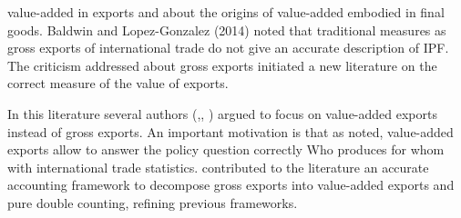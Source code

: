 value-added in exports and about the origins of value-added embodied in final goods.
Baldwin and Lopez-Gonzalez (2014)  noted that traditional measures as gross exports of international trade do not give an accurate description of IPF.
The criticism addressed about gross exports initiated a new literature on the correct measure of the value of exports. \par
In this literature several authors (\cite{johnson},\cite{daudin2011}, \cite{Koopman}) argued to focus on value-added exports instead of gross exports.
An important motivation is that as \textcite{daudin2011} noted, value-added exports allow to answer the policy question correctly \textquotedbl{}Who produces for whom\textquotedbl{} with international trade statistics.
\textcite{Koopman} contributed to the literature an accurate accounting framework to decompose gross exports into value-added exports and pure double counting, refining previous frameworks.%
 \par
